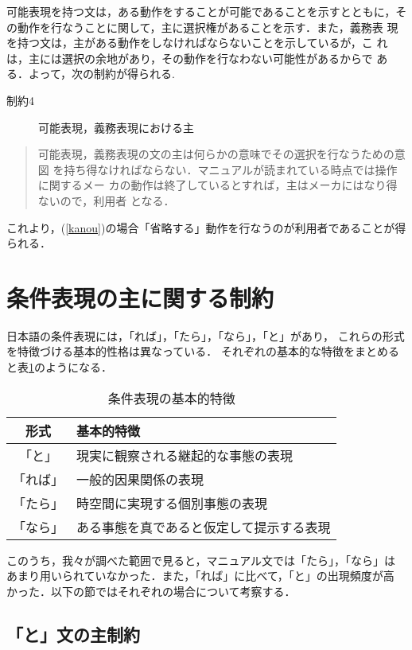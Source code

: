 可能表現を持つ文は，ある動作をすることが可能であることを示すとともに，そ
の動作を行なうことに関して，{\dg 主}に選択権があることを示す．また，義務表
現を持つ文は，{\dg 主}がある動作をしなければならないことを示しているが，こ
れは，{\dg 主}には選択の余地があり，その動作を行なわない可能性があるからで
ある．よって，次の制約が得られる.
\begin{description}
\item[制約4] 可能表現，義務表現における{\dg 主} 
\end{description}
\begin{quote}
可能表現，義務表現の文の{\dg 主}は何らかの意味でその選択を行なうための意図
を持ち得なければならない．マニュアルが読まれている時点では操作に関するメー
カの動作は終了しているとすれば，{\dg 主}はメーカにはなり得ないので，利用者
となる．
\end{quote}
これより，(\ref{kanou})の場合「省略する」動作を行なうのが利用者であることが得られる．

\section{条件表現の{\dg 主}に関する制約}
日本語の条件表現には，「れば」，「たら」，「なら」，「と」があり，
これらの形式を特徴づける基本的性格は異なっている\cite{masu}．
それぞれの基本的な特徴をまとめると表\ref{kihon}のようになる．
\begin{table}[htbp]
  \begin{center}
 \caption{条件表現の基本的特徴} \label{kihon}
   \begin{tabular}{|c|l|}\hline
       形式 & 基本的特徴\\\hline\hline
      「と」& 現実に観察される継起的な事態の表現\\\hline
    「れば」& 一般的因果関係の表現\\\hline
    「たら」& 時空間に実現する個別事態の表現\\\hline
    「なら」& ある事態を真であると仮定して提示する表現\\\hline
   \end{tabular}
  \end{center} 
\end{table}
このうち，我々が調べた範囲で見ると，マニュアル文では「たら」，「なら」は
あまり用いられていなかった．また，「れば」に比べて，「と」の出現頻度が高
かった．以下の節ではそれぞれの場合について考察する．

\subsection{「と」文の{\dg 主}制約}

